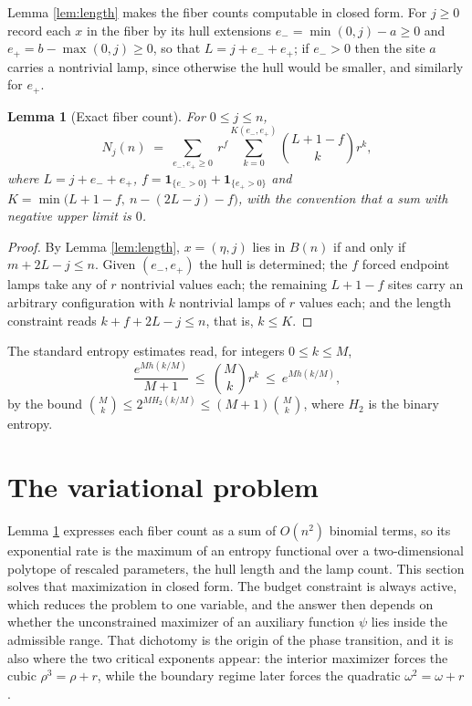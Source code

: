 \documentclass[11pt]{amsart}
\newtheorem{lemma}[theorem]{Lemma}
\theoremstyle{definition}
\theoremstyle{remark}
\begin{document}
Lemma \ref{lem:length} makes the fiber counts computable in closed form. For $j\ge0$ record each $x$ in the fiber by its hull extensions $e_-=\min(0,j)-a\ge0$ and $e_+=b-\max(0,j)\ge0$, so that $L=j+e_-+e_+$; if $e_->0$ then the site $a$ carries a nontrivial lamp, since otherwise the hull would be smaller, and similarly for $e_+$.

\begin{lemma}[Exact fiber count]\label{lem:count}
For $0\le j\le n$,
\[
N_j(n)\;=\;\sum_{e_-,e_+\ge0}\ r^{f}\!\!\sum_{k=0}^{K(e_-,e_+)}\binom{L+1-f}{k}r^{k},
\]
where $L=j+e_-+e_+$, $f=\mathbf 1_{\{e_->0\}}+\mathbf 1_{\{e_+>0\}}$ and
$K=\min\big(L+1-f,\ n-(2L-j)-f\big)$, with the convention that a sum with negative upper limit is $0$.
\end{lemma}

\begin{proof}
By Lemma \ref{lem:length}, $x=(\eta,j)$ lies in $B(n)$ if and only if $m+2L-j\le n$. Given $(e_-,e_+)$ the hull is determined; the $f$ forced endpoint lamps take any of $r$ nontrivial values each; the remaining $L+1-f$ sites carry an arbitrary configuration with $k$ nontrivial lamps of $r$ values each; and the length constraint reads $k+f+2L-j\le n$, that is, $k\le K$.
\end{proof}

The standard entropy estimates read, for integers $0\le k\le M$,
\begin{equation}\label{eq:entropy}
\frac{e^{M h(k/M)}}{M+1}\ \le\ \binom Mk r^{k}\ \le\ e^{M h(k/M)} ,
\end{equation}
by the bound $\binom Mk\le 2^{M H_2(k/M)}\le(M+1)\binom Mk$, where $H_2$ is the binary entropy.

\section{The variational problem}\label{sec:variational}

Lemma \ref{lem:count} expresses each fiber count as a sum of $O(n^{2})$ binomial terms, so its exponential rate is the maximum of an entropy functional over a two-dimensional polytope of rescaled parameters, the hull length and the lamp count. This section solves that maximization in closed form. The budget constraint is always active, which reduces the problem to one variable, and the answer then depends on whether the unconstrained maximizer of an auxiliary function $\psi$ lies inside the admissible range. That dichotomy is the origin of the phase transition, and it is also where the two critical exponents appear: the interior maximizer forces the cubic $\rho^{3}=\rho+r$, while the boundary regime later forces the quadratic $\omega^{2}=\omega+r$.
\end{document}
